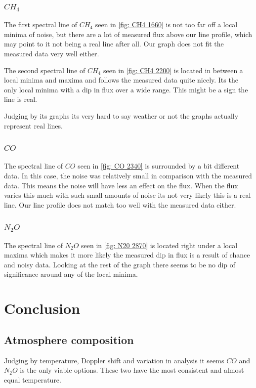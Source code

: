 \documentclass[reprint,english,notitlepage]{revtex4-2}
\begin{document}
\subsubsection*{$ CH_4 $}
The first spectral line of $ CH_4 $ seen in \ref{fig: CH4 1660} is not too far off a local minima of noise, but there are a lot of measured flux above our line profile, which may point to it not being a real line after all. Our graph does not fit the measured data very well either. 

The second spectral line of $ CH_4 $ seen in \ref{fig: CH4 2200} is located in between a local minima and maxima and follows the measured data quite nicely. Its the only local minima with a dip in flux over a wide range. This might be a sign the line is real. 

Judging by its graphs its very hard to say weather or not the graphs actually represent real lines. 

\subsubsection*{$ CO $}
The spectral line of $ CO $ seen in \ref{fig: CO 2340} is surrounded by a bit different data. In this case, the noise was relatively small in comparison with the measured data. This means the noise will have less an effect on the flux. When the flux varies this much with such small amounts of noise its not very likely this is a real line. Our line profile does not match too well with the measured data either. 

\subsubsection*{$ N_2O $}
The spectral line of $ N_2O $ seen in \ref{fig: N20 2870} is located right under a local maxima which makes it more likely the measured dip in flux is a result of chance and noisy data. Looking at the rest of the graph there seems to be no dip of significance around any of the local minima. 


\section{Conclusion} \label{sec: conclusion}
\subsection{Atmosphere composition} \label{ssec: Atmpos Comp}
Judging by temperature, Doppler shift and variation in analysis it seems $ CO $ and $ N_2O $ is the only viable options. These two have the most consistent and almost equal temperature. 
\end{document}
